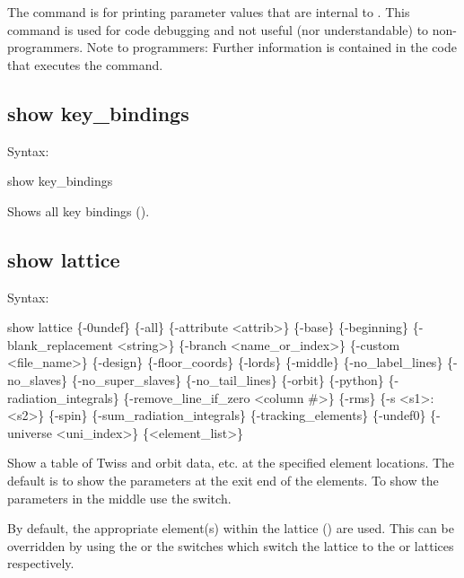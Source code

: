 {{{{{{{{The  command is for printing parameter values that are internal to \tao. This
command is used for code debugging and not useful (nor understandable) to non-programmers. Note to
programmers: Further information is contained in the code that executes the 
command.


\subsection{show key_bindings}
\label{s:show.key}

Syntax:
\begin{example}
  show key_bindings
\end{example}

Shows all key bindings ().


\subsection{show lattice}
\label{s:show.lattice}

Syntax:
\begin{example}
  show lattice \{-0undef\} \{-all\} \{-attribute <attrib>\} \{-base\} \{-beginning\}
      \{-blank_replacement <string>\}  \{-branch <name_or_index>\}
      \{-custom <file_name>\} \{-design\} \{-floor_coords\} \{-lords\} \{-middle\}
      \{-no_label_lines\} \{-no_slaves\} \{-no_super_slaves\} \{-no_tail_lines\} \{-orbit\} 
      \{-python\} \{-radiation_integrals\} \{-remove_line_if_zero <column \#>\} 
      \{-rms\} \{-s <s1>:<s2>\} \{-spin\} \{-sum_radiation_integrals\} \{-tracking_elements\} 
      \{-undef0\} \{-universe <uni_index>\} \{<element_list>\} 
\end{example}

Show a table of Twiss and orbit data, etc. at the specified element locations. The default is to
show the parameters at the exit end of the elements. To show the parameters in the middle use the
 switch.

By default, the appropriate element(s) within the  lattice () are
used. This can be overridden by using the  or the  switches which switch the
lattice to the  or  lattices respectively.

}}}}}}}}
